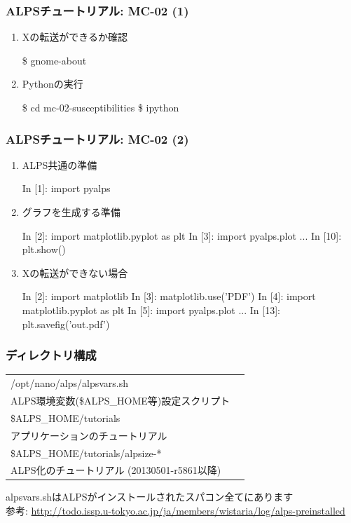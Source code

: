 \begin{frame}[fragile]
  \frametitle{ALPSチュートリアル: MC-02 (1)}
  \begin{enumerate}
  \item<1-> Xの転送ができるか確認
\begin{semiverbatim}
 \$ gnome-about
\end{semiverbatim}
  \item<1-> Pythonの実行
\begin{semiverbatim}
 \$ cd mc-02-susceptibilities
 \$ ipython
\end{semiverbatim}
  \end{enumerate}
\end{frame}

\begin{frame}[fragile,shrink=5]
  \frametitle{ALPSチュートリアル: MC-02 (2)}
  \begin{enumerate}
  \item<2-> ALPS共通の準備
\begin{semiverbatim}
In [1]: import pyalps
\end{semiverbatim}
  \item<3-> グラフを生成する準備
\begin{semiverbatim}
In [2]: import matplotlib.pyplot as plt
In [3]: import pyalps.plot
...
In [10]: plt.show()
\end{semiverbatim}
  \item<3-> Xの転送ができない場合
\begin{semiverbatim}
In [2]: import matplotlib
In [3]: matplotlib.use('PDF')
In [4]: import matplotlib.pyplot as plt
In [5]: import pyalps.plot
...
In [13]: plt.savefig('out.pdf')
\end{semiverbatim}
  \end{enumerate}
\end{frame}

\begin{frame}
  \frametitle{ディレクトリ構成}
  \begin{tabular}{ll}
    /opt/nano/alps/alpsvars.sh & \\
    \hspace*{3em} ALPS環境変数(\$ALPS\_HOME等)設定スクリプト \\
    \$ALPS\_HOME/tutorials & \\
    \hspace*{3em} アプリケーションのチュートリアル \\
    \$ALPS\_HOME/tutorials/alpsize-* & \\
    \hspace*{3em} ALPS化のチュートリアル (20130501-r5861以降)
  \end{tabular}
  \begin{alertblock}{}
    alpsvars.shはALPSがインストールされたスパコン全てにあります \\
    参考: {\footnotesize \url{http://todo.issp.u-tokyo.ac.jp/ja/members/wistaria/log/alps-preinstalled}}
\end{alertblock}
\end{frame}

